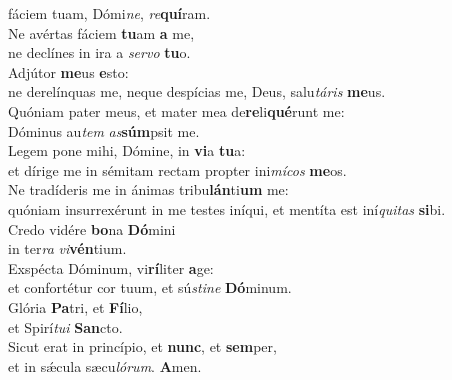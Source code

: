 \oddverse fáciem tuam, Dómi\textit{ne}, \textit{re}\textbf{quí}ram.\\
\evenverse Ne avértas fáciem \textbf{tu}am \textbf{a} me,~\*\\
\evenverse ne declínes in ira a \textit{ser}\textit{vo} \textbf{tu}o.\\
\oddverse Adjútor \textbf{me}us \textbf{e}sto:~\*\\
\oddverse ne derelínquas me, neque despícias me, Deus, salu\textit{tá}\textit{ris} \textbf{me}us.\\
\evenverse Quóniam pater meus, et mater mea de\textbf{re}li\textbf{qué}runt me:~\*\\
\evenverse Dóminus au\textit{tem} \textit{as}\textbf{súm}psit me.\\
\oddverse Legem pone mihi, Dómine, in \textbf{vi}a \textbf{tu}a:~\*\\
\oddverse et dírige me in sémitam rectam propter ini\textit{mí}\textit{cos} \textbf{me}os.\\
\evenverse Ne tradíderis me in ánimas tribu\textbf{lán}ti\textbf{um} me:~\*\\
\evenverse quóniam insurrexérunt in me testes iníqui, et mentíta est iní\textit{qui}\textit{tas} \textbf{si}bi.\\
\oddverse Credo vidére \textbf{bo}na \textbf{Dó}mini~\*\\
\oddverse in ter\textit{ra} \textit{vi}\textbf{vén}tium.\\
\evenverse Exspécta Dóminum, vi\textbf{rí}liter \textbf{a}ge:~\*\\
\evenverse et confortétur cor tuum, et sú\textit{sti}\textit{ne} \textbf{Dó}minum.\\
\oddverse Glória \textbf{Pa}tri, et \textbf{Fí}lio,~\*\\
\oddverse et Spirí\textit{tu}\textit{i} \textbf{San}cto.\\
\evenverse Sicut erat in princípio, et \textbf{nunc}, et \textbf{sem}per,~\*\\
\evenverse et in sǽcula sæcu\textit{ló}\textit{rum}. \textbf{A}men.\\
